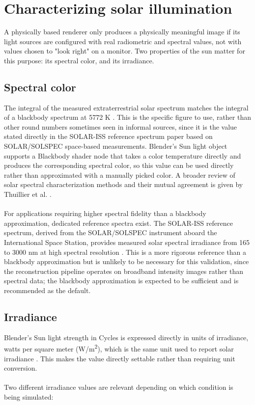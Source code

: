 \section{Characterizing solar illumination}

A physically based renderer only produces a physically meaningful image if its light sources are configured with real radiometric and spectral values, not with values chosen to "look right" on a monitor. Two properties of the sun matter for this purpose: its spectral color, and its irradiance.

\subsection{Spectral color}

The integral of the measured extraterrestrial solar spectrum matches the integral of a blackbody spectrum at 5772 K \cite{meftah2018solariss}. This is the specific figure to use, rather than other round numbers sometimes seen in informal sources, since it is the value stated directly in the SOLAR-ISS reference spectrum paper based on SOLAR/SOLSPEC space-based measurements. Blender's Sun light object supports a Blackbody shader node that takes a color temperature directly and produces the corresponding spectral color, so this value can be used directly rather than approximated with a manually picked color. A broader review of solar spectral characterization methods and their mutual agreement is given by Thuillier et al. \cite{thuillier2022solarspectra}.
\\\\
For applications requiring higher spectral fidelity than a blackbody approximation, dedicated reference spectra exist. The SOLAR-ISS reference spectrum, derived from the SOLAR/SOLSPEC instrument aboard the International Space Station, provides measured solar spectral irradiance from 165 to 3000 nm at high spectral resolution \cite{meftah2018solariss}. This is a more rigorous reference than a blackbody approximation but is unlikely to be necessary for this validation, since the reconstruction pipeline operates on broadband intensity images rather than spectral data; the blackbody approximation is expected to be sufficient and is recommended as the default.

\subsection{Irradiance}

Blender's Sun light strength in Cycles is expressed directly in units of irradiance, watts per square meter (W/m\textsuperscript{2}), which is the same unit used to report solar irradiance \cite{blendergrid_physical_brightness}. This makes the value directly settable rather than requiring unit conversion.
\\\\
Two different irradiance values are relevant depending on which condition is being simulated:

